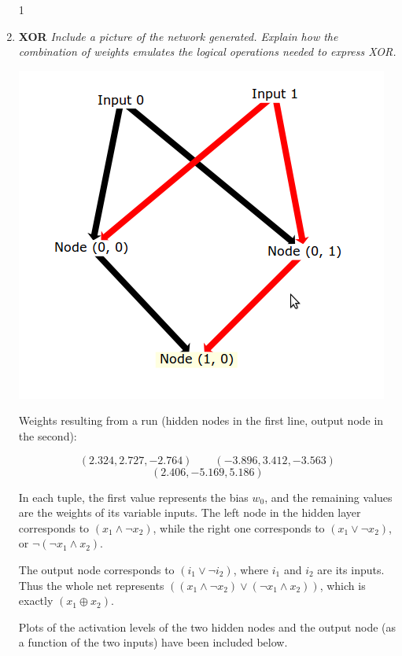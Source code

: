 \documentclass{article}
\begin{document}
  \begin{enumerate}

    \setcounter{enumi}1
  \item \textbf{XOR} \textit{Include a picture of the network
    generated. Explain how the combination of weights emulates the
    logical operations needed to express XOR.}

    \begin{center}
      \includegraphics[scale=.4]{xor_net.png}
    \end{center}

    Weights resulting from a run (hidden nodes in the first line,
    output node in the second):

    \[(2.324, 2.727, -2.764)\qquad(-3.896, 3.412, -3.563)\]
    \[(2.406, -5.169, 5.186)\]

    In each tuple, the first value represents the bias $w_0$, and the
    remaining values are the weights of its variable inputs. The left
    node in the hidden layer corresponds to $(x_1\wedge\lnot x_2)$,
    while the right one corresponds to $(x_1\vee\lnot x_2)$, or
    $\lnot(\lnot x_1\wedge x_2)$.

    The output node corresponds to $(i_1\vee\lnot i_2)$, where $i_1$
    and $i_2$ are its inputs. Thus the whole net represents
    $((x_1\wedge\lnot x_2)\vee(\lnot x_1\wedge x_2))$, which is
    exactly $(x_1\oplus x_2)$.

    Plots of the activation levels of the two hidden nodes and the
    output node (as a function of the two inputs) have been included
    below.


\end{enumerate}
\end{document}
